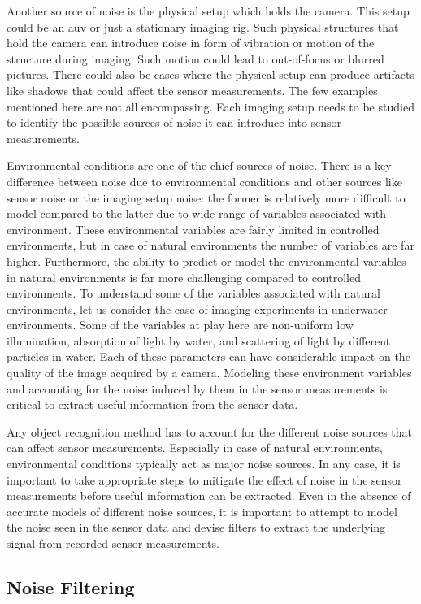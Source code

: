 \documentclass {udthesis}
\begin{document}
Another source of noise is the physical setup which holds the camera. This setup could be an \gls{auv} or just a stationary imaging rig. Such physical structures that hold the camera can introduce noise in form of vibration or motion of the structure during imaging. Such motion could lead to out-of-focus or blurred pictures. There could also be cases where the physical setup can produce artifacts like shadows that could affect the sensor measurements. The few examples mentioned here are not all encompassing. Each imaging setup needs to be studied to identify the possible sources of noise it can introduce into sensor measurements.

Environmental conditions are one of the chief sources of noise. 
There is a key difference between noise due to environmental conditions 
and other sources like sensor noise or the imaging setup noise: the former is relatively more difficult to model compared to the latter due to wide range of variables associated with environment. 
These environmental variables are fairly limited in controlled environments, but in case of natural environments
the number of variables are far higher. Furthermore, the ability to predict or model the environmental variables in natural
environments is far more challenging compared to controlled environments. To understand some of the variables associated with natural environments, let us consider the case of imaging experiments in underwater environments. 
Some of the variables at play here are non-uniform low illumination, absorption of light by water,
and scattering of light by different particles in water. Each of these parameters can have considerable impact on the quality of the image acquired by
a camera. Modeling these environment variables and accounting for the noise induced by them in the sensor measurements is critical to extract useful
information from the sensor data.

Any object recognition method has to account for the different noise sources that can affect sensor measurements. Especially in case of natural environments, environmental conditions typically act as major noise sources. 
In any case, it is important to take appropriate steps to mitigate the effect of noise 
in the sensor measurements before useful information can be extracted. 
Even in the absence of accurate models of different noise sources, it is important to attempt to model the noise seen in the sensor data
and devise filters to extract the underlying signal from recorded sensor measurements.

\subsection{Noise Filtering}
\label{sec:noise_filters}
\end{document}

